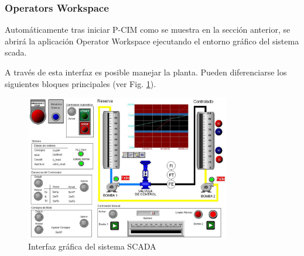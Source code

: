 \subsubsection{Operators Workspace}

Automáticamente tras iniciar P-CIM como se muestra en la sección anterior, se 
abrirá la aplicación Operator Workspace ejecutando el entorno gráfico del 
sistema \gls{scada}.

A través de esta interfaz es posible manejar la planta.
Pueden diferenciarse los siguientes bloques principales
(ver Fig. \ref{fig:hmiscada2}).

\begin{figure}[!ht]
	\centering
	\includegraphics[width=0.8\textwidth]
	{Cap5-SCADA/images/hmiScada.jpeg}
	\caption[]{Interfaz gráfica del sistema SCADA}
	\label{fig:hmiscada2}
  \end{figure}
  
